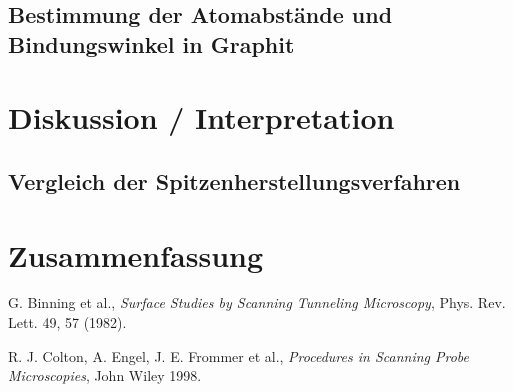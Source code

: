 \documentclass[10pt, a4paper]{article}
\begin{document}
\subsection{Bestimmung der Atomabstände und Bindungswinkel in Graphit}


\section{Diskussion / Interpretation}

\subsection{Vergleich der Spitzenherstellungsverfahren}

\section{Zusammenfassung}


\begin{thebibliography}{9}

  G. Binning et al.,
  \emph{Surface Studies by Scanning Tunneling Microscopy},
  Phys. Rev. Lett. 49, 57 (1982).

  R. J. Colton, A. Engel, J. E. Frommer et al.,
  \emph{Procedures in Scanning Probe Microscopies},
  John Wiley 1998.
  
\end{thebibliography}
\end{document}
